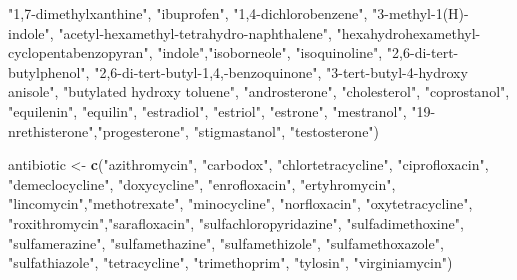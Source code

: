 \documentclass[
]{article}
\newenvironment{Shaded}{\begin{snugshade}}{\end{snugshade}}
\newcommand{\KeywordTok}[1]{\textcolor[rgb]{0.13,0.29,0.53}{\textbf{#1}}}
\newcommand{\NormalTok}[1]{#1}
\newcommand{\StringTok}[1]{\textcolor[rgb]{0.31,0.60,0.02}{#1}}
\begin{document}
\begin{Shaded}
\begin{Highlighting}[]
                 \StringTok{"1,7-dimethylxanthine"}\NormalTok{, }\StringTok{"ibuprofen"}\NormalTok{, }\StringTok{"1,4-dichlorobenzene"}\NormalTok{, }
                 \StringTok{"3-methyl-1(H)-indole"}\NormalTok{, }\StringTok{"acetyl-hexamethyl-tetrahydro-naphthalene"}\NormalTok{,}
                 \StringTok{"hexahydrohexamethyl-cyclopentabenzopyran"}\NormalTok{, }\StringTok{"indole"}\NormalTok{,}\StringTok{"isoborneole"}\NormalTok{,  }
                 \StringTok{"isoquinoline"}\NormalTok{, }\StringTok{"2,6-di-tert-butylphenol"}\NormalTok{,}
                 \StringTok{"2,6-di-tert-butyl-1,4,-benzoquinone"}\NormalTok{, }
                 \StringTok{"3-tert-butyl-4-hydroxy anisole"}\NormalTok{, }\StringTok{"butylated hydroxy toluene"}\NormalTok{,}
                 \StringTok{"androsterone"}\NormalTok{, }\StringTok{"cholesterol"}\NormalTok{, }\StringTok{"coprostanol"}\NormalTok{, }\StringTok{"equilenin"}\NormalTok{, }
                 \StringTok{"equilin"}\NormalTok{, }\StringTok{"estradiol"}\NormalTok{, }\StringTok{"estriol"}\NormalTok{, }\StringTok{"estrone"}\NormalTok{, }\StringTok{"mestranol"}\NormalTok{, }
                 \StringTok{"19-nrethisterone"}\NormalTok{,}\StringTok{"progesterone"}\NormalTok{, }\StringTok{"stigmastanol"}\NormalTok{, }\StringTok{"testosterone"}\NormalTok{)}

\NormalTok{antibiotic <-}\StringTok{ }\KeywordTok{c}\NormalTok{(}\StringTok{"azithromycin"}\NormalTok{, }\StringTok{"carbodox"}\NormalTok{, }\StringTok{"chlortetracycline"}\NormalTok{, }\StringTok{"ciprofloxacin"}\NormalTok{, }
                \StringTok{"demeclocycline"}\NormalTok{, }\StringTok{"doxycycline"}\NormalTok{, }\StringTok{"enrofloxacin"}\NormalTok{, }\StringTok{"ertyhromycin"}\NormalTok{, }
                \StringTok{"lincomycin"}\NormalTok{,}\StringTok{"methotrexate"}\NormalTok{, }\StringTok{"minocycline"}\NormalTok{, }\StringTok{"norfloxacin"}\NormalTok{, }
                \StringTok{"oxytetracycline"}\NormalTok{, }\StringTok{"roxithromycin"}\NormalTok{,}\StringTok{"sarafloxacin"}\NormalTok{, }
                \StringTok{"sulfachloropyridazine"}\NormalTok{, }\StringTok{"sulfadimethoxine"}\NormalTok{, }\StringTok{"sulfamerazine"}\NormalTok{,}
                \StringTok{"sulfamethazine"}\NormalTok{, }\StringTok{"sulfamethizole"}\NormalTok{, }\StringTok{"sulfamethoxazole"}\NormalTok{, }
                \StringTok{"sulfathiazole"}\NormalTok{, }\StringTok{"tetracycline"}\NormalTok{, }\StringTok{"trimethoprim"}\NormalTok{, }\StringTok{"tylosin"}\NormalTok{, }
                \StringTok{"virginiamycin"}\NormalTok{)}


\end{Highlighting}
\end{Shaded}
\end{document}
